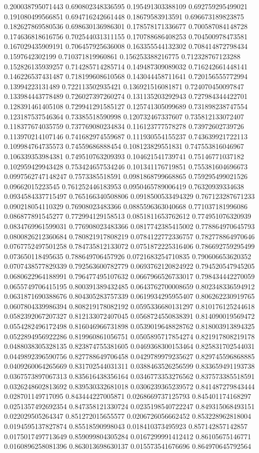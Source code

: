 \begin{table}
\begin{tabu}
\begin{sparkline}{10}
0.200038795071443 0.690802348336595 0.195491303388109 0.692759295499021 0.191080499566851 0.694716242661448 0.18679583913591 0.696673189823875 0.182627869580536 0.698630136986301 0.178578171336677 0.700587084148728 0.174636818616756 0.702544031311155 0.170788686408253 0.704500978473581 0.167029435909191 0.706457925636008 0.163355544132302 0.708414872798434 0.1597642302199 0.710371819960861 0.156253388216775 0.712328767123288 0.152826135939257 0.714285714285714 0.149487309089032 0.716242661448141 0.146226537431487 0.718199608610568 0.143044458711641 0.720156555772994 0.13994223131489 0.722113502935421 0.136921516081871 0.724070450097847 0.133984443778489 0.726027397260274 0.131135203292943 0.727984344422701 0.128391461405108 0.729941291585127 0.125741305099689 0.731898238747554 0.123187537546364 0.73385518590998 0.120732467337607 0.735812133072407 0.118377674035759 0.737769080234834 0.116123777578278 0.73972602739726 0.113970214107146 0.741682974559687 0.111930554155237 0.743639921722113 0.109984764735573 0.74559686888454 0.108123829551831 0.747553816046967 0.106339353984381 0.749510763209393 0.104621541739741 0.75146771037182 0.102959429943428 0.753424657534246 0.101341176719851 0.755381604696673 0.0997562747148247 0.7573385518591 0.0981868799668865 0.759295499021526 0.09662015223545 0.761252446183953 0.0950465789006419 0.76320939334638 0.0934584337715497 0.765166340508806 0.0918500533494329 0.767123287671233 0.090218054110329 0.76908023483366 0.0885596363040668 0.771037181996086 0.086877891545277 0.772994129158513 0.0851811653762612 0.774951076320939 0.0834769961599031 0.776908023483366 0.0817742385415002 0.778864970645793 0.0800826212360684 0.780821917808219 0.0784122772336757 0.782778864970646 0.0767752497501258 0.784735812133072 0.0751872225316406 0.786692759295499 0.073650118495635 0.788649706457926 0.0721683254710835 0.790606653620352 0.0707438577829339 0.792563600782779 0.0693762120824922 0.794520547945205 0.0680622964188991 0.796477495107632 0.0667966526733017 0.798434442270059 0.0655749706415195 0.800391389432485 0.0643762700008659 0.802348336594912 0.0631871690388676 0.804305283757339 0.0619934295955407 0.806262230919765 0.0607804339986394 0.808219178082192 0.0595336680131297 0.810176125244618 0.0582392067207327 0.812133072407045 0.0568724550838391 0.814090019569472 0.0554282496172498 0.816046966731898 0.0539019648828762 0.818003913894325 0.0522894956922286 0.819960861056751 0.0505895717854274 0.821917808219178 0.0488038305328135 0.823874755381605 0.0469368300153464 0.825831702544031 0.0449892396590756 0.827788649706458 0.0429789979235627 0.829745596868885 0.0409260064265669 0.831702544031311 0.0388463526256599 0.833659491193738 0.0367573897067313 0.835616438356164 0.0346773353276562 0.837573385518591 0.0326248602813692 0.839530332681018 0.0306239365239572 0.841487279843444 0.028701149717095 0.843444227005871 0.0268669737125793 0.845401174168297 0.0251357492692354 0.847358121330724 0.0235198540722247 0.849315068493151 0.022029505264347 0.851272015655577 0.0206726056662452 0.853228962818004 0.0194595137827874 0.85518590998043 0.018410373495923 0.857142857142857 0.0175017497713649 0.859099804305284 0.0167299991412412 0.86105675146771 0.0160896258081396 0.863013698630137 0.015573541676696 0.864970645792564 
\end{sparkline}
\end{tabu}
\end{table}
